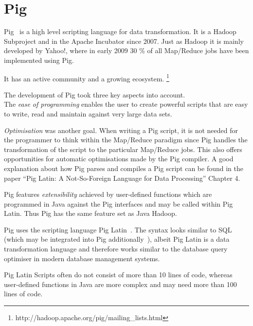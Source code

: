 \section{Pig}

Pig~\cite{pigWebsite} is a high level scripting language for data transformation. It is a Hadoop Subproject and in the Apache Incubator since 2007. Just as Hadoop it is mainly developed by Yahoo!, where in early 2009 30 \% of all Map/Reduce jobs have been implemented using Pig.~\cite{pig30percent}

It has an active community and a growing ecosystem. \footnote{http://hadoop.apache.org/pig/mailing_lists.html}

The development of Pig took three key aspects into account. ~\cite{pigWebsite} \\
The \emph{ease of programming} enables the user to create powerful scripts that are easy to write, read and maintain against very large data sets.

\emph{Optimisation} was another goal. When writing a Pig script, it is not needed for the programmer to think within the Map/Reduce paradigm since Pig handles the transformation of the script to the particular Map/Reduce jobs. This also offers opportunities for automatic optimisations made by the Pig compiler. A good explanation about how Pig parses and compiles a Pig script can be found in the paper ``Pig Latin: A Not-So-Foreign Language for Data Processing'' Chapter 4.~\cite{pigNotForeign}

Pig features \emph{extensibility} achieved by user-defined functions which are programmed in Java against the Pig interfaces and may be called within Pig Latin. Thus Pig has the same feature set as Java Hadoop.

Pig uses the scripting language Pig Latin~\cite{pigManual}. The syntax looks similar to SQL (which may be integrated into Pig additionally~\cite{pigSql}), albeit Pig Latin is a data transformation language and therefore works similar to the database query optimiser in modern database management systems.

Pig Latin Scripts often do not consist of more than 10 lines of code, whereas user-defined functions in Java are more complex and may need more than 100 lines of code.
                                                                                                               